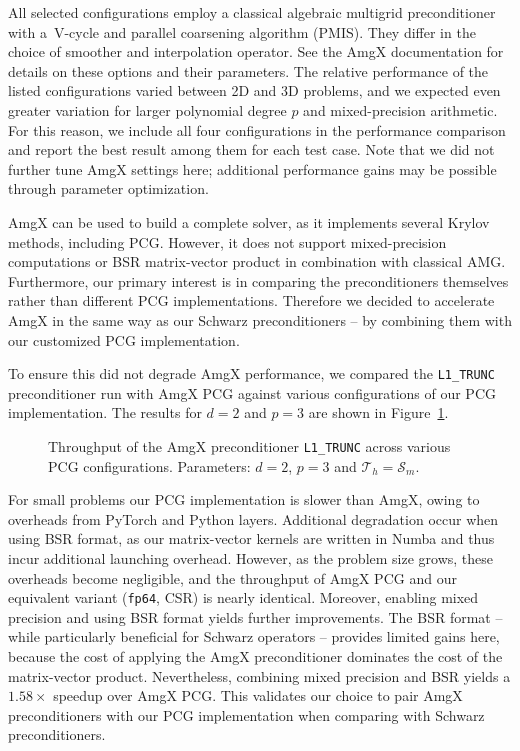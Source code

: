 \documentclass[11pt]{article}
\theoremstyle{definition}
\theoremstyle{theorem}
\begin{document}
All selected configurations employ a classical algebraic multigrid preconditioner
with a~V\nobreakdash-cycle and parallel coarsening algorithm (PMIS). They differ
in the choice of smoother and interpolation operator. See the AmgX
documentation \cite{amgx-reference} for details on these options and their
parameters. The relative performance of the listed configurations varied
between 2D and 3D problems, and we expected even greater variation for larger
polynomial degree $p$ and mixed-precision arithmetic.
For this reason, we include all four configurations in the performance comparison
and report the best result among them for each test case.
Note that we did not further tune AmgX settings here; additional performance
gains may be possible through parameter optimization.

AmgX can be used to build a complete solver, as it implements several Krylov
methods, including PCG. However, it does not support mixed-precision
computations or BSR matrix-vector product in combination with classical AMG.
Furthermore, our primary interest is in comparing the preconditioners themselves
rather than different PCG implementations. Therefore we decided
to accelerate AmgX in the same way as our Schwarz preconditioners -- by
combining them with our customized PCG implementation.

To ensure this did not degrade AmgX performance, we compared the
\verb|L1_TRUNC| preconditioner run with AmgX PCG against various configurations
of our PCG implementation. The results for $d=2$ and $p=3$ are shown in
Figure~\ref{fig:amgx-pcg-throughput}.

\begin{figure}
  \centering
  
  \caption{Throughput of the AmgX preconditioner
  \texttt{L1\_TRUNC} across various PCG configurations.
  Parameters: $d=2$, $p=3$ and $\mathcal{T}_h=\mathcal{S}_m$.}
  \label{fig:amgx-pcg-throughput}
\end{figure}

For small problems our PCG implementation is slower than AmgX, owing to overheads
from PyTorch and Python layers. Additional degradation occur when using BSR format,
as our matrix-vector kernels are written in Numba and thus incur additional launching overhead.
However, as the problem size grows, these overheads become negligible,
and the throughput of AmgX PCG and our equivalent variant (\verb|fp64|, CSR)
is nearly identical. Moreover, enabling mixed precision and using BSR format yields
further improvements. The BSR format -- while particularly beneficial for Schwarz operators
-- provides limited gains here, because the cost of applying the AmgX preconditioner
dominates the cost of the matrix-vector product. Nevertheless, combining
mixed precision and BSR yields a $1.58\times$ speedup over AmgX PCG.
This validates our choice to pair AmgX preconditioners with our PCG implementation
when comparing with Schwarz preconditioners.
\end{document}
